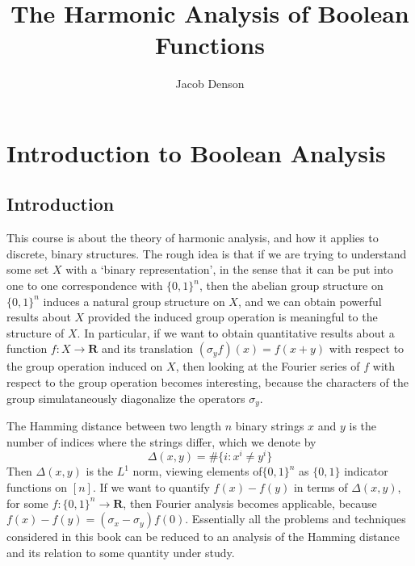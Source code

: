 

\title{The Harmonic Analysis of Boolean Functions}
\author{Jacob Denson}




\maketitle

\tableofcontents


\chapter{Introduction to Boolean Analysis}

\section{Introduction}

This course is about the theory of harmonic analysis, and how it applies to discrete, binary structures. The rough idea is that if we are trying to understand some set $X$ with a `binary representation', in the sense that it can be put into one to one correspondence with $\{ 0, 1 \}^n$, then the abelian group structure on $\{ 0, 1 \}^n$ induces a natural group structure on $X$, and we can obtain powerful results about $X$ provided the induced group operation is meaningful to the structure of $X$. In particular, if we want to obtain quantitative results about a function $f: X \to \mathbf{R}$ and its translation $(\sigma_y f)(x) = f(x + y)$ with respect to the group operation induced on $X$, then looking at the Fourier series of $f$ with respect to the group operation becomes interesting, because the characters of the group simulataneously diagonalize the operators $\sigma_y$.

\begin{example}
    The Hamming distance between two length $n$ binary strings $x$ and $y$ is the number of indices where the strings differ, which we denote by
    \[ \Delta(x,y) = \# \{ i : x^i \neq y^i \} \]
    Then $\Delta(x,y)$ is the $L^1$ norm, viewing elements of$ \{ 0, 1 \}^n$ as $\{ 0, 1 \}$ indicator functions on $[n]$. If we want to quantify $f(x) - f(y)$ in terms of $\Delta(x,y)$, for some $f: \{ 0, 1 \}^n \to \mathbf{R}$, then Fourier analysis becomes applicable, because $f(x) - f(y) = (\sigma_x - \sigma_y) f(0)$. Essentially all the problems and techniques considered in this book can be reduced to an analysis of the Hamming distance and its relation to some quantity under study.
\end{example}

